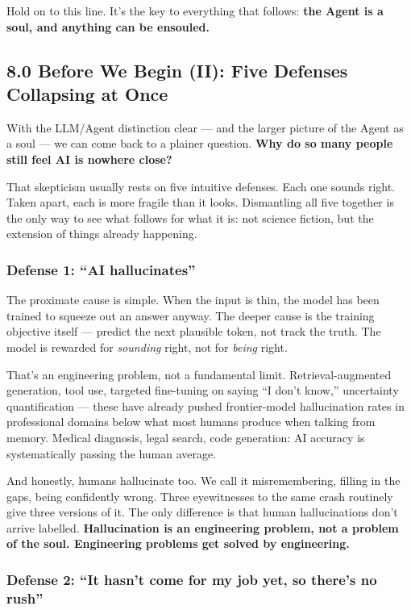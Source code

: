 \documentclass[11pt,a4paper]{article}
\begin{document}
Hold on to this line. It's the key to everything that follows: \textbf{the Agent is a soul, and anything can be ensouled.}

\subsection{8.0 Before We Begin (II): Five Defenses Collapsing at Once}

With the LLM/Agent distinction clear --- and the larger picture of the Agent as a soul --- we can come back to a plainer question. \textbf{Why do so many people still feel AI is nowhere close?}

That skepticism usually rests on five intuitive defenses. Each one sounds right. Taken apart, each is more fragile than it looks. Dismantling all five together is the only way to see what follows for what it is: not science fiction, but the extension of things already happening.

\subsubsection{Defense 1: ``AI hallucinates''}

The proximate cause is simple. When the input is thin, the model has been trained to squeeze out an answer anyway. The deeper cause is the training objective itself --- predict the next plausible token, not track the truth. The model is rewarded for \textit{sounding} right, not for \textit{being} right.

That's an engineering problem, not a fundamental limit. Retrieval-augmented generation, tool use, targeted fine-tuning on saying ``I don't know,'' uncertainty quantification --- these have already pushed frontier-model hallucination rates in professional domains below what most humans produce when talking from memory. Medical diagnosis, legal search, code generation: AI accuracy is systematically passing the human average.

And honestly, humans hallucinate too. We call it misremembering, filling in the gaps, being confidently wrong. Three eyewitnesses to the same crash routinely give three versions of it. The only difference is that human hallucinations don't arrive labelled. \textbf{Hallucination is an engineering problem, not a problem of the soul. Engineering problems get solved by engineering.}

\subsubsection{Defense 2: ``It hasn't come for my job yet, so there's no rush''}
\end{document}
